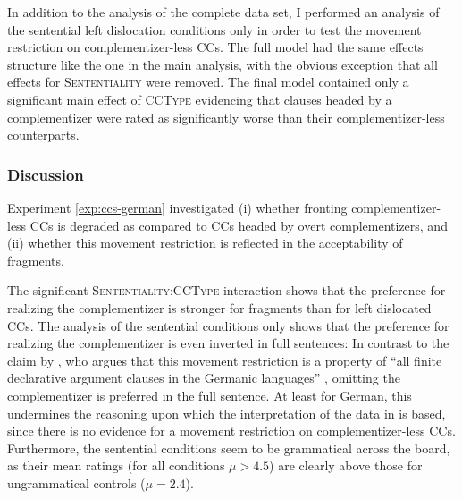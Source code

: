 In addition to the analysis of the complete data set, I performed an analysis of the sentential left dislocation conditions only in order to test the movement restriction on complementizer-less CCs. The full model had the same effects structure like the one in the main analysis, with the obvious exception that all effects for \textsc{Sententiality} were removed. The final model contained only a significant main effect of \textsc{CCType}  evidencing that clauses headed by a complementizer were rated as significantly worse than their complementizer-less counterparts.

\subsubsection{Discussion}
Experiment \ref{exp:ccs-german} investigated (i) whether fronting complementizer-less CCs is degraded as compared to CCs headed by overt complementizers, and (ii) whether this movement restriction is reflected in the acceptability of fragments. 

The significant \textsc{Sententiality:CCType} interaction shows that the preference for realizing the complementizer is stronger for fragments than for left dislocated CCs. The analysis of the sentential conditions only shows that the preference for realizing the complementizer is even inverted in full sentences: In contrast to the claim by \citet{webelhuth1992}, who argues that this movement restriction is a property of ``all finite declarative argument clauses in the Germanic languages'' \citep[83]{webelhuth1992}, omitting the complementizer is preferred in the full sentence. At least for German, this undermines the reasoning upon which the interpretation of the data in \citet{merchant.etal2013} is based, since there is no evidence for a movement restriction on complementizer-less CCs. Furthermore, the sentential conditions seem to be grammatical across the board, as their mean ratings (for all conditions $\mu > 4.5$) are clearly above those for ungrammatical controls ($\mu = 2.4$). 

